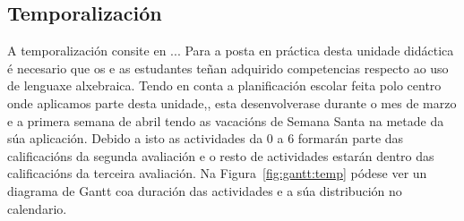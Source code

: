 \subsection{Temporalización}
A temporalización consite en ... Para a posta en práctica desta unidade didáctica é necesario que os e as estudantes teñan adquirido competencias respecto ao uso de lenguaxe alxebraica. Tendo en conta a planificación escolar feita polo centro onde aplicamos parte desta unidade,, esta desenvolverase durante o mes de marzo e a primera semana de abril tendo as vacacións de Semana Santa na metade da súa aplicación. Debido a isto as actividades da 0 a 6 formarán parte das calificacións da segunda avaliación e o resto de actividades estarán dentro das calificacións da terceira avaliación. Na Figura~\ref{fig:gantt:temp} pódese ver un diagrama de Gantt coa duración das actividades e a súa distribución no calendario.

